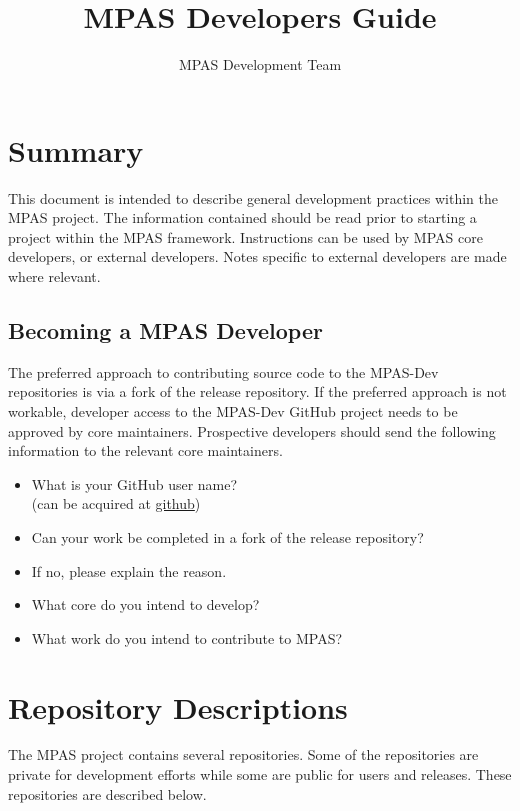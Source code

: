 \documentclass[11pt]{report}
\begin{document}
\title{MPAS Developers Guide}
\author{MPAS Development Team}

\maketitle
\tableofcontents


\chapter{Summary}
This document is intended to describe general development practices within the
MPAS project. The information contained should be read prior to starting a
project within the MPAS framework. Instructions can be used by MPAS core
developers, or external developers. Notes specific to external developers are
made where relevant.

\section{Becoming a MPAS Developer}
The preferred approach to contributing source code to the MPAS-Dev repositories
is via a fork of the release repository. If the preferred approach is not
workable, developer access to the MPAS-Dev GitHub project needs to be approved
by core maintainers. Prospective developers should send the following
information to the relevant core maintainers.
\begin{itemize}
	\item What is your GitHub user name? \\
		(can be acquired at \href{http://www.github.com}{github})
	\item Can your work be completed in a fork of the release repository?
	\item If no, please explain the reason.
	\item What core do you intend to develop?
	\item What work do you intend to contribute to MPAS?
\end{itemize}

\chapter{Repository Descriptions}
The MPAS project contains several repositories. Some of the repositories are
private for development efforts while some are public for users and releases.
These repositories are described below.
\end{document}
